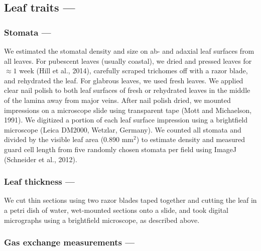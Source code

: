 \documentclass[
  letterpaper,
  DIV=11,
  numbers=noendperiod]{scrartcl}
\begin{document}
\hypertarget{leaf-traits}{%
\subsection{Leaf traits ---}\label{leaf-traits}}

\hypertarget{stomata}{%
\subsubsection{Stomata ---}\label{stomata}}

We estimated the stomatal density and size on ab- and adaxial leaf
surfaces from all leaves. For pubescent leaves (usually coastal), we
dried and pressed leaves for \(\approx 1\) week (Hill et al., 2014),
carefully scraped trichomes off with a razor blade, and rehydrated the
leaf. For glabrous leaves, we used fresh leaves. We applied clear nail
polish to both leaf surfaces of fresh or rehydrated leaves in the middle
of the lamina away from major veins. After nail polish dried, we mounted
impressions on a microscope slide using transparent tape (Mott and
Michaelson, 1991). We digitized a portion of each leaf surface
impression using a brightfield microscope (Leica DM2000, Wetzlar,
Germany). We counted all stomata and divided by the visible leaf area
(0.890 mm\(^2\)) to estimate density and measured guard cell length from
five randomly chosen stomata per field using ImageJ (Schneider et al.,
2012).

\hypertarget{leaf-thickness}{%
\subsubsection{Leaf thickness ---}\label{leaf-thickness}}

We cut thin sections using two razor blades taped together and cutting
the leaf in a petri dish of water, wet-mounted sections onto a slide,
and took digital micrographs using a brightfield microscope, as
described above.

\hypertarget{gas-exchange-measurements}{%
\subsubsection{Gas exchange measurements
---}\label{gas-exchange-measurements}}
\end{document}
